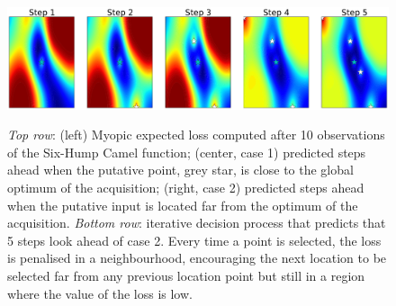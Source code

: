 \documentclass[twoside]{article}
\begin{document}
\begin{figure}[t!]
\begin{center}\label{fig:steps_ahead}
\includegraphics[width=16cm]{steps.pdf}
\end{center}\caption{\emph{Top row}: (left) Myopic expected loss computed after 10 observations of the Six-Hump Camel function; (center, case 1) predicted steps ahead when the putative point, grey star, is close to the global optimum of the acquisition; (right, case 2) predicted steps ahead when the putative input is located far from the optimum of the acquisition. \emph{Bottom row}: iterative decision process that predicts that 5 steps look ahead of case 2. Every time a point is selected, the loss is penalised in a neighbourhood, encouraging the next location to be selected far from any previous location point but still in a region where the value of the loss is low.}
\end{figure}
\end{document}
